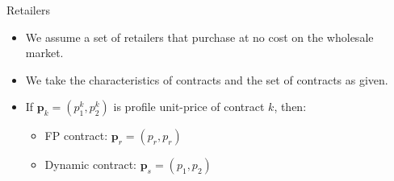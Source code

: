 \documentclass{class}
\begin{document}
\begin{frame}{Retailers}

\begin{itemize}
    \item We assume a set of retailers that purchase at no cost on the wholesale market.

    \vfill

    \item We take the characteristics of contracts and the set of contracts as given.  \vfill
    
    \item If $\textbf{p}_k=(p_1^k,p_2^k)$ is profile unit-price of contract $k$, then:  \vfill

    \begin{itemize}
        \item FP contract: $\textbf{p}_{r} =  (p_r,p_r)$ \vfill
        \item Dynamic contract: $\textbf{p}_{s} =  (p_1,p_2)$
    \end{itemize}

\end{itemize}


    
\end{frame}

\end{document}
